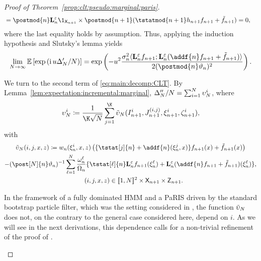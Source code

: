 \begin{proof}[Proof of Theorem~\ref{prop:clt:pseudo:marginal:paris}]
\begin{align*}
&= \postmod{n} \ukmod{n} \1_{\Xset_{n + 1}} \times \postmod{n + 1}(\tstatmod{n + 1} h_{n + 1} f_{n + 1} + \ftd{n + 1}) = 0,
\end{align*}
where the last equality holds by assumption. Thus, applying the induction hypothesis and Slutsky's lemma yields 
\begin{equation} \label{eq:weak:limit:termprime}
\lim_{N \to \infty} \pE \left[ \exp \left(\im u \termprime / \N \right) \right] = \exp \left( - u^2 \frac{\sigma_n^2 \langle \ukmod{n} f_{n + 1}; \ukmod{n}(\addf{n} f_{n + 1} + \ftd{n + 1}) \rangle}{2 (\postmod{n} \adjfuncforward{n})^2} \right).  
\end{equation}

We turn to the second term of \eqref{eq:main:decomp:CLT}. By Lemma~\ref{lem:expectation:incremental:marginal}, $\Delta_N^{\prime \prime} / N = \sum_{i = 1}^N \upsilon^i_N$, where
$$
\upsilon^i_\N \eqdef \frac{1}{\K \sqrt{\N}} \sum_{j = 1}^{\K} \tilde{\upsilon}_\N(I_{n + 1}^i, J_{n + 1}^{(i, j)}, \epart{n + 1}{i}, \zpart{n + 1}{i}),
$$
with
\begin{multline*}
\tilde{\upsilon}_\N(i, j, x, z) \eqdef \wgtfunc{n}(\epart{n}{i}, x, z)
\left( \{\tstat[j]{n} + \addf{n}(\epart{n}{j}, x)\} f_{n + 1}(x) + \ftd{n + 1}(x) \right) \\
 -  (\post[\N]{n} \adjfuncforward{n})^{-1} \sum_{\ell = 1}^\N \frac{\ewght{n}{\ell}}{\sumwght{n}} \{ \tstat[\ell]{n} \ukmod{n} f_{n + 1}(\epart{n}{\ell}) + \ukmod{n}(\addf{n} f_{n + 1} + \ftd{n + 1})(\epart{n}{\ell}) \}, \\
 \quad (i, j, x, z) \in \intvect{1}{\N}^2 \times \Xset_{n + 1} \times \Zset_{n + 1}.
\end{multline*}
\begin{remark} \label{rem:non-trivial:extension}
In the framework of a fully dominated HMM and a PaRIS driven by the standard bootstrap particle filter, which was the setting considered in \cite{olsson:westerborn:2014b}, the function $\tilde{\upsilon}_N$ does not, on the contrary to the general case considered here, depend on $i$. As we will see in the next derivations, this dependence calls for a non-trivial refinement of the proof of \cite[Theorem~3]{olsson:westerborn:2014b}. 
\end{remark}


\end{proof}

